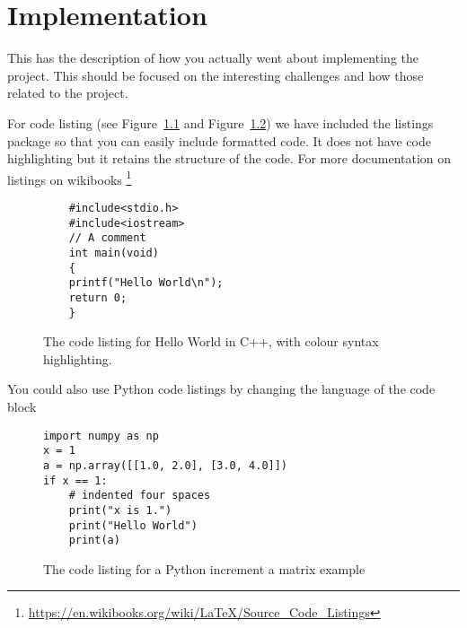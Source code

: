 \chapter{Implementation}
\label{chap:implementation}
This has the description of how you actually went about implementing the project.  This should be focused on the interesting challenges and how those related to the project.



For code listing (see Figure~\ref{fig:HelloWorldC++} and Figure~\ref{fig:PythonCode}) we have included the listings package so that you can easily include formatted code.  It does not have code highlighting but it retains the structure of the code.  For more documentation on listings on wikibooks \footnote{\url{https://en.wikibooks.org/wiki/LaTeX/Source_Code_Listings}}




\begin{figure}[tp] 
  \centering
{}
\begin{lstlisting}
    #include<stdio.h>
    #include<iostream>
    // A comment
    int main(void)
    {
    printf("Hello World\n");
    return 0;
    }
\end{lstlisting}

  \caption[Hello World C++]{The code listing for Hello World in C++, with colour syntax highlighting.}
  \label{fig:HelloWorldC++}
\end{figure}

You could also use Python code listings by changing the language of the code block

\begin{figure}[tp] 

  \centering
\lstset{language=Python}
\begin{lstlisting}
import numpy as np
x = 1
a = np.array([[1.0, 2.0], [3.0, 4.0]])
if x == 1:
    # indented four spaces
    print("x is 1.")
    print("Hello World")
    print(a)

\end{lstlisting}
  \caption[Python code example]{The code listing for a Python increment a matrix example}
  \label{fig:PythonCode}
\end{figure}



